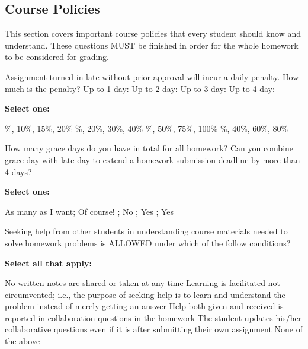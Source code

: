 \documentclass[11pt,addpoints,answers]{exam}
\numberwithin{equation}{section} %
\numberwithin{figure}{section} %
\numberwithin{table}{section} %
\begin{document}
\subsection{Course Policies}
This section covers important course policies that every student should know and understand. These questions MUST be finished in order for the whole homework to be considered for grading.

\begin{questions}
    \question[1] Assignment turned in late without prior approval will incur a daily penalty. How much is the penalty? Up to 1 day: \underline{\hspace{0.5cm}} Up to 2 day: \underline{\hspace{0.5cm}} Up to 3 day:
    \underline{\hspace{0.5cm}} Up to 4 day:
    \underline{\hspace{0.5cm}} 
    
    \textbf{Select one:}
    \begin{checkboxes}
        \%, 10\%, 15\%, 20\%
        \%, 20\%, 30\%, 40\%
        \%, 50\%, 75\%, 100\%
        \%, 40\%, 60\%, 80\%
    \end{checkboxes}

    
    \question[1] How many grace days do you have in total for all homework? Can you combine grace day with late day to extend a homework submission deadline by more than 4 days?
    
    \textbf{Select one:}
    \begin{checkboxes}
        \choice As many as I want; Of course!
        ; No
        ; Yes
        ; Yes
    \end{checkboxes}

    
    \question[1] Seeking help from other students in understanding course materials needed to solve homework problems is ALLOWED under which of the follow conditions?
    
    \textbf{Select all that apply:}
    {%
    \checkboxchar{$\Box$} \checkedchar{$\blacksquare$}
        \begin{checkboxes}
        \choice No written notes are shared or taken at any time
        \choice Learning is facilitated not circumvented; i.e., the purpose of seeking help is to learn and understand the problem instead of merely getting an answer
        \choice Help both given and received is reported in collaboration questions in the homework
        \choice The student updates his/her collaborative questions even if it is after submitting their own assignment
        \choice None of the above
    \end{checkboxes}
    }
\clearpage
    

\end{questions}
\end{document}
